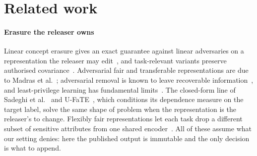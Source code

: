 \documentclass[conference]{IEEEtran}
\begin{document}
\section{Related work}
\label{sec:related}

\paragraph{Erasure the releaser owns} Linear concept erasure gives an exact guarantee against linear
adversaries on a representation the releaser may edit~\cite{belrose2023leace}, and task-relevant variants
preserve authorised covariance~\cite{holstege2025splince}. Adversarial fair and transferable
representations are due to Madras et al.~\cite{madras2018laftr}; adversarial removal is known to leave
recoverable information~\cite{elazar2018adversarial}, and least-privilege learning has fundamental
limits~\cite{stadler2024leastprivilege}. The closed-form line of Sadeghi et
al.~\cite{sadeghi2019sarl,sadeghi2021optnetarl,sadeghi2022ktopt} and U-FaTE~\cite{dehdashtian2024ufate},
which conditions its dependence measure on the target label, solve the same shape of problem when the
representation is the releaser's to change. Flexibly fair representations let each task drop a different
subset of sensitive attributes from one shared encoder~\cite{creager2019ffvae}. All of these assume what our setting denies: here the published output is immutable
and the only decision is what to append.
\end{document}

